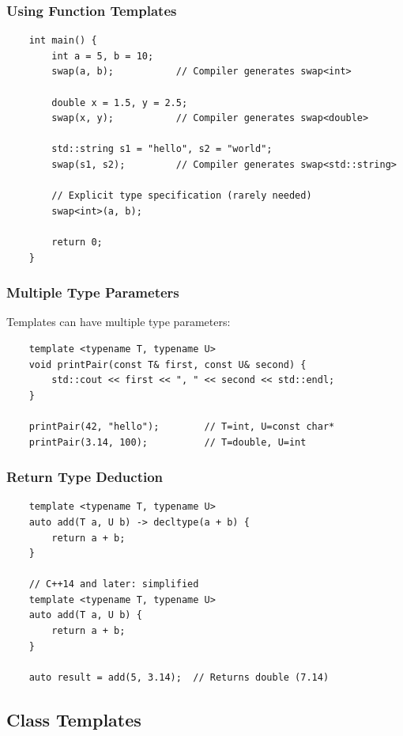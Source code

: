 \subsubsection{Using Function Templates}

\begin{lstlisting}
	int main() {
		int a = 5, b = 10;
		swap(a, b);           // Compiler generates swap<int>
		
		double x = 1.5, y = 2.5;
		swap(x, y);           // Compiler generates swap<double>
		
		std::string s1 = "hello", s2 = "world";
		swap(s1, s2);         // Compiler generates swap<std::string>
		
		// Explicit type specification (rarely needed)
		swap<int>(a, b);
		
		return 0;
	}
\end{lstlisting}

\subsubsection{Multiple Type Parameters}

Templates can have multiple type parameters:

\begin{lstlisting}
	template <typename T, typename U>
	void printPair(const T& first, const U& second) {
		std::cout << first << ", " << second << std::endl;
	}
	
	printPair(42, "hello");        // T=int, U=const char*
	printPair(3.14, 100);          // T=double, U=int
\end{lstlisting}

\subsubsection{Return Type Deduction}

\begin{lstlisting}
	template <typename T, typename U>
	auto add(T a, U b) -> decltype(a + b) {
		return a + b;
	}
	
	// C++14 and later: simplified
	template <typename T, typename U>
	auto add(T a, U b) {
		return a + b;
	}
	
	auto result = add(5, 3.14);  // Returns double (7.14)
\end{lstlisting}

\subsection{Class Templates}

